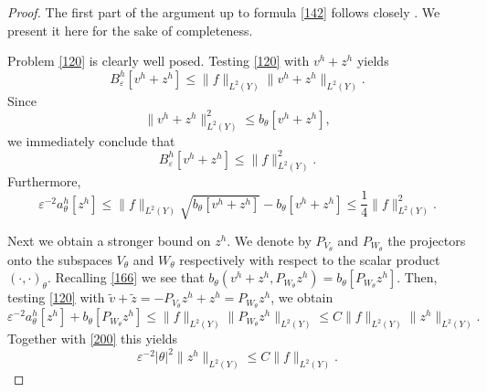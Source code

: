 \documentclass[11pt]{article}
\newcommand\e {\varepsilon}
\theoremstyle{remark}
\begin{document}
\begin{proof}
	The first part of the argument up to formula \eqref{142} follows closely \cite{CKS2023}. We present it here for the sake of completeness.
	
	Problem \eqref{120} is clearly well posed.
	Testing \eqref{120} with $v^h+z^h$    yields
	\begin{equation*}
		B^h_\e[v^h+z^h] \leq \|f\|_{L^2(Y)} \|v^h+z^h\|_{L^2(Y)}.
	\end{equation*}
	Since
	\begin{equation*}
		\|v^h+z^h\|_{L^2(Y)}^2 \leq b_\theta[v^h+z^h],
	\end{equation*}
	we immediately conclude that
	\begin{equation*}
		B^h_\e[v^h+z^h] \leq  \|f\|_{L^2(Y)}^2.
	\end{equation*}
	Furthermore,
	\begin{equation*}%
		\e^{-2} a_\theta^h[z^h ] \leq \|f\|_{L^2(Y)} \sqrt{ b_\theta[v^h+z^h]} -  b_\theta[v^h+z^h]\leq \frac{1}{4} \|f\|_{L^2(Y)}^2.
	\end{equation*}
	
	Next we obtain a stronger bound on $z^h$.  We denote by $P_{V_\theta}$ and $P_{W_\theta}$ the projectors onto the subspaces $V_\theta$ and $W_\theta$ respectively with respect to the scalar product $(\cdot ,\cdot )_\theta$. Recalling \eqref{166} we see that $b_\theta(v^h+z^h, P_{W_\theta} z^h ) = b_\theta[P_{W_\theta} z^h ]$. 	Then, testing \eqref{120} with $\tilde v +\widetilde z = -P_{V_\theta} z^h + z^h = P_{W_\theta} z^h$, we obtain
	\begin{equation*}
		\e^{-2} a_\theta^h[z^h ]  + b_\theta[P_{W_\theta} z^h ]\leq \|f\|_{L^2(Y)}  \| P_{W_\theta} z^h\|_{L^2(Y)} \leq C \|f\|_{L^2(Y)}  \| z^h\|_{L^2(Y)} .
	\end{equation*}
	Together with \eqref{200} this yields
	\begin{equation}\label{135}
		\e^{-2} |\theta|^2 \| z^h\|_{L^2(Y)} \leq C \|f\|_{L^2(Y)}.
	\end{equation}
	

\end{proof}
\end{document}
